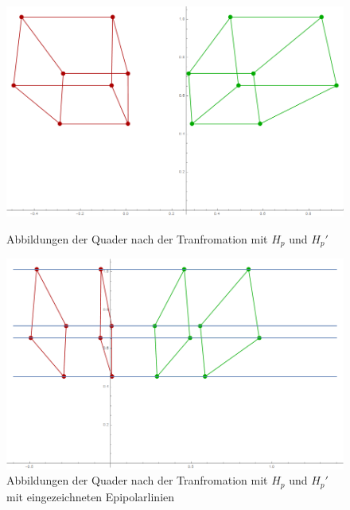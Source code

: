 
\begin{figure}[!htb]
	\includegraphics[width=\linewidth]{images/Rectification_Hp_same_Solutions.png}
	\caption[Projektive Transformationen $H_p$ und $H_p'$]{Abbildungen der Quader nach der Tranfromation mit $H_p$ und $H_p'$}
	\label{fig:RectSameHp1}
	\endminipage\hfill
	\includegraphics[width=\linewidth]{images/Rectification_Hp_same_Solutions_Lines.png}
	\caption[Projektive Transformationen $H_p$ und $H_p'$ mit Epipolarlinien]{Abbildungen der Quader nach der Tranfromation mit $H_p$ und $H_p'$ mit eingezeichneten Epipolarlinien}
	\label{fig:RectSameHp2}
	\endminipage\hfill
\end{figure}

